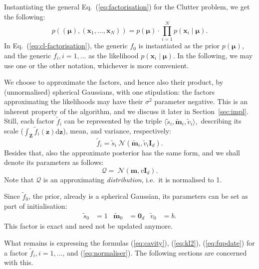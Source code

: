 \documentclass[11pt]{article}
\newcommand{\vek}[1]{\ensuremath{\mathbf{#1}}}
\newcommand{\kve}{\ensuremath{\mathcal{Q}}}
\newcommand{\byd}{\ensuremath{\mathrm{d}}}
\newcommand{\norm}{\ensuremath{\:\mathcal{N}}}
\newcommand{\unity}{\ensuremath{\mathbf{I}}}
\begin{document}
Instantiating the general Eq.~(\ref{eq:factorisation}) for the Clutter 
problem, we get the following:
\begin{equation}
	p((\boldsymbol{\mu}), (\vek{x}_1, \dots, \vek{x}_N)) = p(\boldsymbol{\mu}) \cdot \prod_{i 
	= 1}^{N}{p(\vek{x}_i\mid\boldsymbol{\mu})}.
	\label{eq:cl-factorisation}
\end{equation}
In Eq.~(\ref{eq:cl-factorisation}), the generic $f_0$ is instantiated as 
the prior $p(\boldsymbol{\mu})$, and the generic $f_i, i = 1,\dots$ as the likelihood
$p(\vek{x}_i\mid\boldsymbol{\mu})$. In the following, we may use one or the other notation, 
whichever is more convenient.

We choose to approximate the factors, and hence also their product, by 
(unnormalised) spherical Gaussians, with one stipulation: the factors 
approximating the likelihoods may have their $\sigma^2$ parameter negative.  
This is an inherent property of the algorithm, and we discuss it later in 
Section~\ref{sec:impl}. Still, each factor $\tilde{f}_i$ can be represented 
by the triple $\langle \tilde{s}_i, \vek{\tilde{m}}_i, \tilde{v}_i\rangle,$ 
describing its scale ($\int_{\vek{Z}} \tilde{f}_i(\vek{z})\byd\vek{z}$), 
mean, and variance, respectively:
\begin{equation}
	\tilde{f}_i = \tilde{s}_i\norm(\vek{\tilde{m}}_i, \tilde{v}_i\unity_{d}).
	\label{eq:fac-notation}
\end{equation}
Besides that, also the approximate posterior has the same form, and we 
shall denote its parameters as follows:
\begin{equation}
	\kve = \norm(\vek{m}, v\unity_{d}).
	\label{eq:kve-notation}
\end{equation}
Note that $\kve$ is an approximating \emph{distribution}, i.e.\ it is 
normalised to 1.

Since $\tilde{f}_0$, the prior, already is a spherical Gaussian, its 
parameters can be set as part of initialisation:
\begin{align}
	\tilde{s}_0 &= 1 &
	\tilde{\vek{m}}_0 &= \vek{0}_d &
	\tilde{v}_0 &= b.
\end{align}
This factor is exact and need not be updated anymore.

What remains is expressing the formulas (\ref{eq:cavity}), (\ref{eq:kl2}), 
(\ref{eq:fupdate}) for a factor $\tilde{f}_i, i=1, \dots$, and 
(\ref{eq:normaliser}).  The following sections are concerned with this.

\end{document}
